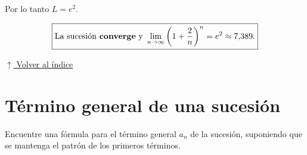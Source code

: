 \documentclass[12pt]{article}
\newcommand{\volverindice}{%
    \vspace{1em}%
    \begin{flushright}%
        \hyperlink{indice}{\small $\uparrow$ Volver al índice}%
    \end{flushright}%
}
\begin{document}
\begin{enumerate}[label=\alph*.-]
    Por lo tanto $L=e^{2}$.

    \[
    \boxed{
    \text{La sucesión \textbf{converge} y }
    \lim_{n\to\infty}\left(1+\frac2n\right)^{n}=e^{2}\approx 7{,}389 .
    }
    \]

\end{enumerate}

\volverindice
\newpage


\section{Término general de una sucesión}

Encuentre una fórmula para el término general $a_n$ de la sucesión, suponiendo
que se mantenga el patrón de los primeros términos.
\end{document}
